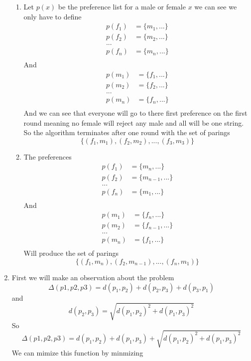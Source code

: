 \documentclass[11pt]{article}
\begin{document}
\begin{enumerate}
		\begin{enumerate}
		\item Let $p(x)$ be the preference list for a
			male or female $x$ we can see we only have to
			define
			\begin{align*}
				p(f_1) &= \{ m_1, ... \} \\
				p(f_2) &= \{ m_2, ... \} \\
				... \\
				p(f_n) &= \{ m_n, ... \} \\
			\end{align*}
			And
			\begin{align*}
				p(m_1) &= \{ f_1, ... \} \\
				p(m_2) &= \{ f_2, ... \} \\
				... \\
				p(m_n) &= \{ f_n, ... \} \\
			\end{align*}
		And we can see that everyone will go to there first
			preference on the first round meaning no female
			will reject any male and all will be one string.
			So the algorithm terminates after one round with
			the set of parings
			$$\{(f_1,m_1),(f_2,m_2),...,(f_3,m_3)\}$$
		\item The preferences
			\begin{align*}
				p(f_1) &= \{ m_n, ... \} \\
				p(f_2) &= \{ m_{n-1}, ... \} \\
				... \\
				p(f_n) &= \{ m_1, ... \} \\
			\end{align*}
			And
			\begin{align*}
				p(m_1) &= \{ f_n, ... \} \\
				p(m_2) &= \{ f_{n-1}, ... \} \\
				... \\
				p(m_n) &= \{ f_1, ... \} \\
			\end{align*}
			Will produce the set of parings
				$$\{(f_1,m_n),(f_2,m_{n-1}),...,(f_n,m_1)\}$$
		\end{enumerate}
	\item First we will make an observation about the problem
		$$\Delta(p1, p2, p3) = d(p_1,p_2) + d(p_2,p_3) + d(p_3,p_1)$$
		and 
		$$d(p_2,p_3) = \sqrt{d(p_1,p_2)^2 + d(p_1,p_3)^2}  $$
		So
		$$\Delta(p1, p2, p3) = d(p_1,p_2) + d(p_1,p_3) +
		\sqrt{d(p_1,p_2)^2 + d(p_1,p_3)^2} $$
		We can mimize this function by minmizing 

\end{enumerate}
\end{document}
